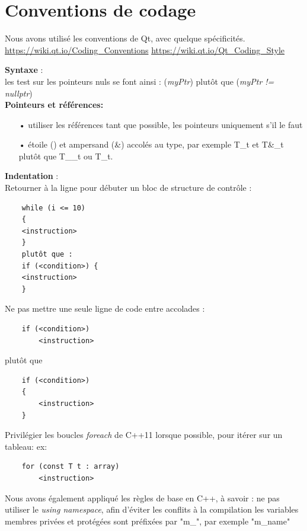 \documentclass[12pt]{article}
\begin{document}
	\newpage
	
	\section{Conventions de codage}	
	Nous avons utilisé les conventions de Qt, avec quelque spécificités.
	\url{https://wiki.qt.io/Coding_Conventions}
	\url{https://wiki.qt.io/Qt_Coding_Style}

	\textbf{Syntaxe} :\\
	les test sur les pointeurs nuls se font ainsi : (\textit{myPtr}) plutôt que (\textit{myPtr != nullptr})\\

	\textbf{Pointeurs et références:}\\
	\begin{itemize}
	\item[•] utiliser les références tant que possible, les pointeurs uniquement s’il le faut
    \item[•] étoile (\*) et ampersand (\&) accolés au type,
    par exemple T\*\_t et T\&\_t
    plutôt que T\_\*\_t
	ou T\_\*t.\\
	\end{itemize}
	
	
	\textbf{Indentation} :\\
	
	Retourner à la ligne pour débuter un bloc de structure de contrôle :
	\begin{verbatim}
	while (i <= 10)
	{
	<instruction>
	}
	plutôt que :
	if (<condition>) {
	<instruction>
	}		
	\end{verbatim}
	
	Ne pas mettre une seule ligne de code entre accolades :
	\begin{verbatim}
	if (<condition>)
		<instruction>
	\end{verbatim}
	
	
	plutôt que
	\begin{verbatim}
	if (<condition>)
	{
		<instruction>
	}
	\end{verbatim}	
	
	Privilégier les boucles \textit{foreach} de C++11 lorsque possible, pour itérer sur un tableau:
	ex:
	\begin{verbatim}
	for (const T t : array)
		<instruction>
	\end{verbatim}
	
	
	Nous avons également appliqué les règles de base en C++, à savoir :
	ne pas utiliser le \textit{using namespace}, afin d’éviter les conflits à la compilation
	les variables membres privées et protégées sont préfixées
	par "m\_", par exemple "m\_name"
\end{document}
